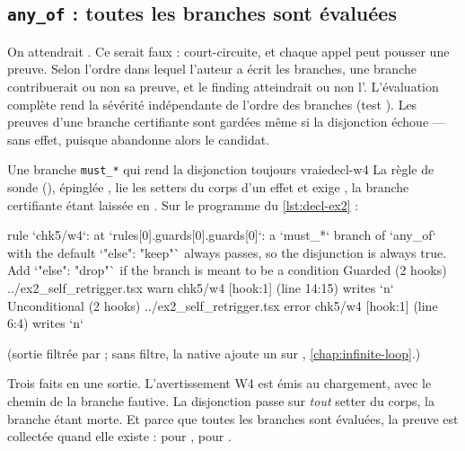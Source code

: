 \subsection{\texttt{any\_of} : toutes les branches sont évaluées}


On attendrait . Ce serait faux :  court-circuite, et chaque appel peut pousser une preuve. Selon l'ordre dans lequel l'auteur a écrit les branches, une branche  contribuerait ou non sa preuve, et le finding atteindrait ou non l'\Error{}. L'évaluation complète rend la sévérité indépendante de l'ordre des branches (test ). Les preuves d'une branche certifiante sont gardées même si la disjonction échoue --- sans effet, puisque  abandonne alors le candidat.

\begin{exemple}{Une branche \texttt{must\_*} qui rend la disjonction toujours vraie}{decl-w4}
La règle de sonde  (), épinglée , lie les setters du corps d'un effet et exige , la branche certifiante étant laissée en . Sur le programme du \cref{lst:decl-ex2} :
\begin{sortie}
[warn] rule `chk5/w4`: at `rules[0].guards[0].guards[0]`: a `must_*` branch of `any_of` with the default `"else": "keep"` always passes, so the disjunction is always true. Add `"else": "drop"` if the branch is meant to be a condition
  Guarded  (2 hooks)  ../ex2_self_retrigger.tsx
    warn   chk5/w4  [hook:1]  (line 14:15)  writes `n`
  Unconditional  (2 hooks)  ../ex2_self_retrigger.tsx
    error  chk5/w4  [hook:1]  (line 6:4)  writes `n`
\end{sortie}
(sortie filtrée par  ; sans filtre, la native  ajoute un \Warning{} sur , \cref{chap:infinite-loop}.)

Trois faits en une sortie. L'avertissement W4 est émis au chargement, avec le chemin de la branche fautive. La disjonction passe sur \emph{tout} setter du corps, la branche  étant morte. Et parce que toutes les branches sont évaluées, la preuve est collectée quand elle existe : \Error{} pour , \Warning{} pour .
\end{exemple}

